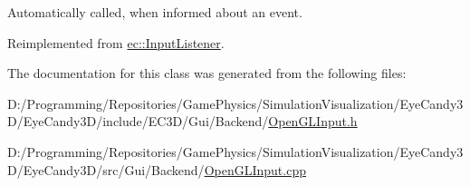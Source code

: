 Automatically called, when informed about an event. 



Reimplemented from \mbox{\hyperlink{classec_1_1_input_listener_a9ceaefc79c6b0b260e88454616137840}{ec\+::\+Input\+Listener}}.



The documentation for this class was generated from the following files\+:\begin{DoxyCompactItemize}
\item 
D\+:/\+Programming/\+Repositories/\+Game\+Physics/\+Simulation\+Visualization/\+Eye\+Candy3\+D/\+Eye\+Candy3\+D/include/\+E\+C3\+D/\+Gui/\+Backend/\mbox{\hyperlink{_open_g_l_input_8h}{Open\+G\+L\+Input.\+h}}\item 
D\+:/\+Programming/\+Repositories/\+Game\+Physics/\+Simulation\+Visualization/\+Eye\+Candy3\+D/\+Eye\+Candy3\+D/src/\+Gui/\+Backend/\mbox{\hyperlink{_open_g_l_input_8cpp}{Open\+G\+L\+Input.\+cpp}}\end{DoxyCompactItemize}
